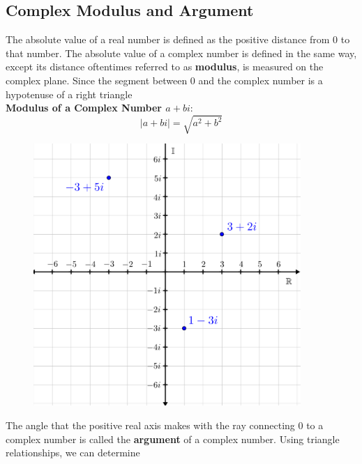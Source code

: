 \documentclass{article}
\begin{document}
        \subsection{Complex Modulus and Argument}

            The absolute value of a real number is defined as the positive distance from 0 to that
            number. The absolute value of a complex number is defined in the same way, except its
            distance oftentimes referred to as \textbf{modulus}, is measured on the complex plane.
            Since the segment between 0 and the complex number is a hypotenuse of a right triangle \\

            \noindent \textbf{Modulus of a Complex Number $a+bi$}: \\

            \begin{equation*}
                |a+bi| = \sqrt{a^2+b^2}
            \end{equation*}

            \begin{figure} [hbt!]
                \centering
                \includegraphics[scale=0.75]{Resources/Unit4Complex/complex.PNG}
            \end{figure}

            \noindent The angle that the positive real axis makes with the ray connecting 0 to a
            complex number is called the \textbf{argument} of a complex number. Using triangle
            relationships, we can determine \\
\end{document}
